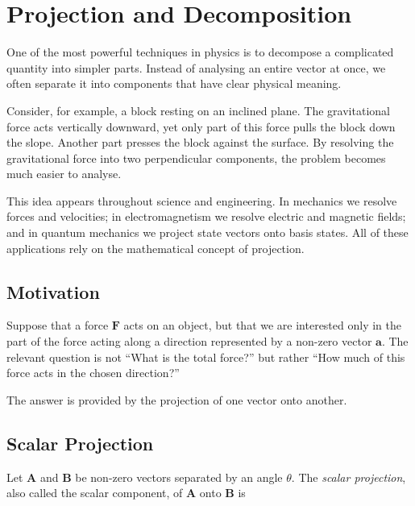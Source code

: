 
\section{Projection and Decomposition}
\label{sec:vector-projection-decomposition}

One of the most powerful techniques in physics is to decompose a complicated
quantity into simpler parts. Instead of analysing an entire vector at once, we
often separate it into components that have clear physical meaning.

Consider, for example, a block resting on an inclined plane. The gravitational
force acts vertically downward, yet only part of this force pulls the block
down the slope. Another part presses the block against the surface. By resolving
the gravitational force into two perpendicular components, the problem becomes
much easier to analyse.

This idea appears throughout science and engineering. In mechanics we resolve
forces and velocities; in electromagnetism we resolve electric and magnetic
fields; and in quantum mechanics we project state vectors onto basis states.
All of these applications rely on the mathematical concept of projection.

\subsection{Motivation}

Suppose that a force $\mathbf F$ acts on an object, but that we are interested
only in the part of the force acting along a direction represented by a non-zero
vector $\mathbf a$. The relevant question is not ``What is the total force?''
but rather ``How much of this force acts in the chosen direction?''

The answer is provided by the projection of one vector onto another.

\subsection{Scalar Projection}

Let $\mathbf A$ and $\mathbf B$ be non-zero vectors separated by an angle
$\theta$. The \emph{scalar projection}, also called the scalar component, of
$\mathbf A$ onto $\mathbf B$ is

